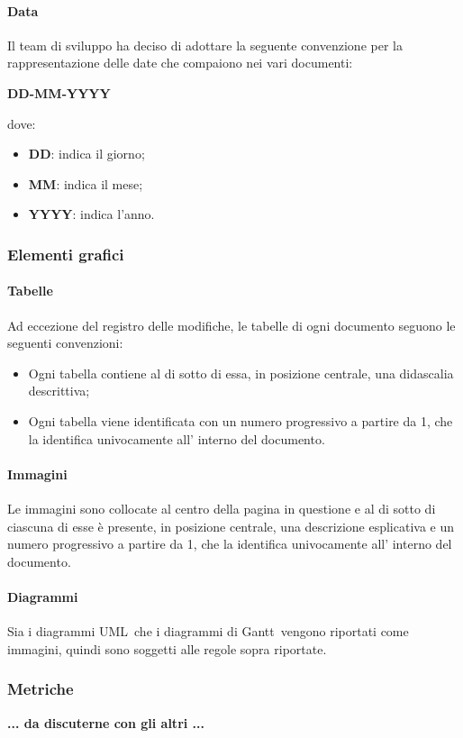 \paragraph{Data}
Il team di sviluppo ha deciso di adottare la seguente convenzione per la rappresentazione delle date che compaiono nei vari documenti:
\begin{center}
    \large{\textbf{DD-MM-YYYY}}
\end{center}
dove:
\begin{itemize}
    \item \textbf{DD}: indica il giorno;
    \item \textbf{MM}: indica il mese;
    \item \textbf{YYYY}: indica l'anno.
\end{itemize}

\subsubsection{Elementi grafici}
\paragraph{Tabelle}
Ad eccezione del registro delle modifiche, le tabelle di ogni documento seguono le seguenti convenzioni:
\begin{itemize}
    \item Ogni tabella contiene al di sotto di essa, in posizione centrale, una didascalia descrittiva;
    \item Ogni tabella viene identificata con un numero progressivo a partire da 1, che la identifica univocamente all' interno del documento.
\end{itemize}
\paragraph{Immagini}
Le immagini sono collocate al centro della pagina in questione e al di sotto di ciascuna di esse è presente, in posizione centrale, una descrizione esplicativa e un numero progressivo a partire da 1, che la identifica univocamente all' interno del documento.
\paragraph{Diagrammi}
Sia i diagrammi UML\glo\ che i diagrammi di Gantt\glo\ vengono riportati come immagini, quindi sono soggetti alle regole sopra riportate.
\subsubsection{Metriche}
\textbf{... da discuterne con gli altri ...}
